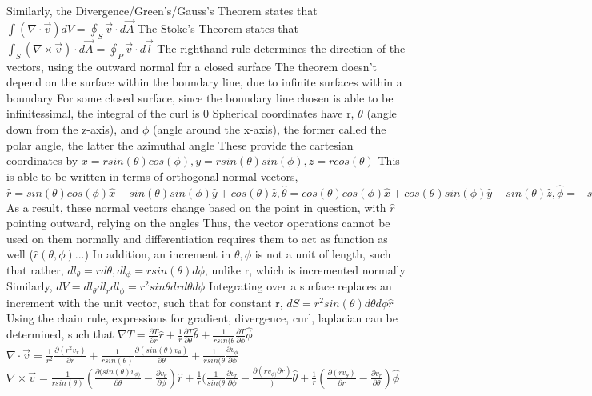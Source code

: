 \documentclass[11 pt, twoside]{article}
\newenvironment{outline*}
{
	\begin{outline}[enumerate]
	}
	{\end{outline}
}
\begin{document}
\begin{outline*}
	\2 Similarly, the Divergence/Green's/Gauss's Theorem states that $\int(\nabla \cdot \vec{v}) dV = \oint_{S} \vec{v} \cdot d\vec{A}$
	\2 The Stoke's Theorem states that $\int_S (\nabla \times \vec{v}) \cdot d\vec{A} = \oint_P \vec{v} \cdot d\vec{l}$
		\3 The righthand rule determines the direction of the vectors, using the outward normal for a closed surface
		\3 The theorem doesn't depend on the surface within the boundary line, due to infinite surfaces within a boundary
		\3 For some closed surface, since the boundary line chosen is able to be infinitessimal, the integral of the curl is 0
\1 Spherical coordinates have r, $\theta$ (angle down from the z-axis), and $\phi$ (angle around the x-axis), the former called the polar angle, the latter the azimuthal angle
	\2 These provide the cartesian coordinates by $x = rsin(\theta)cos(\phi), y = rsin(\theta)sin(\phi), z = rcos(\theta)$
	\2 This is able to be written in terms of orthogonal normal vectors, $\hat{r} = sin(\theta)cos(\phi)\hat{x} + sin(\theta)sin(\phi)\hat{y} + cos(\theta)\hat{z}, \hat{\theta} = cos(\theta)cos(\phi)\hat{x} + cos(\theta)sin(\phi)\hat{y} - sin(\theta)\hat{z}, \hat{\phi} = -sin(\phi)\hat{x} + cos(\phi)\hat{y}$
		\3 As a result, these normal vectors change based on the point in question, with $\hat{r}$ pointing outward, relying on the angles
		\3 Thus, the vector operations cannot be used on them normally and differentiation requires them to act as function as well ($\hat{r}(\theta, \phi)...$)
		\3 In addition, an increment in $\theta, \phi$ is not a unit of length, such that rather, $dl_{\theta} = rd\theta, dl_{\phi} = rsin(\theta)d\phi$, unlike r, which is incremented normally
			\4 Similarly, $dV = dl_{\theta}dl_rdl_{\phi} = r^2sin\theta drd\theta d\phi$
			\4 Integrating over a surface replaces an increment with the unit vector, such that for constant r, $dS = r^2sin(\theta)d\theta d\phi \hat{r}$
	\2 Using the chain rule, expressions for gradient, divergence, curl, laplacian can be determined, such that $\nabla T = \frac{\partial T}{\partial r}\hat{r} + \frac{1}{r}\frac{\partial T}{\partial \theta}\hat{\theta} + \frac{1}{rsin(\theta}\frac{\partial T}{\partial \phi}\hat{\phi}$
		\3 $\nabla \cdot \vec{v} = \frac{1}{r^2}\frac{\partial(r^2v_r)}{\partial r} + \frac{1}{rsin(\theta)}\frac{\partial(sin(\theta)v_{\theta})}{\partial \theta} + \frac{1}{rsin(\theta}\frac{\partial v_{\phi}}{\partial \phi}$
		\3 $\nabla \times \vec{v} = \frac{1}{rsin(\theta)}(\frac{\partial(sin(\theta)v_{\phi)}}{\partial \theta} - \frac{\partial v_{\theta}}{\partial \phi})\hat{r} + \frac{1}{r}(\frac{1}{sin(\theta}\frac{\partial v_r}{\partial \phi} - \frac{\partial(rv_{\phi)}{\partial r})})\hat{\theta} + \frac{1}{r}(\frac{\partial(rv_{\theta})}{\partial r} - \frac{\partial v_r}{\partial \theta})\hat{\phi}$

\end{outline*}
\end{document}
